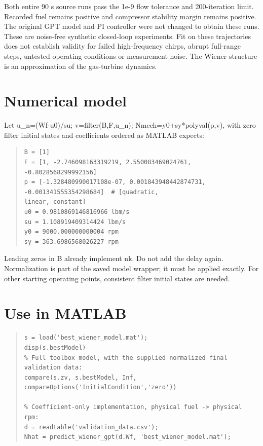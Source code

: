Both entire 90 s source runs pass the 1e-9 flow tolerance and 200-iteration limit.
Recorded fuel remains positive and compressor stability margin remains positive.
The original GPT model and PI controller were not changed to obtain these runs.
These are noise-free synthetic closed-loop experiments. Fit on these trajectories
does not establish validity for failed high-frequency chirps, abrupt full-range
steps, untested operating conditions or measurement noise. The Wiener structure
is an approximation of the gas-turbine dynamics.

\section{Numerical model}

Let u\_\allowbreak n=(Wf-u0)/su; v=filter(B,F,u\_\allowbreak n); Nmech=y0+sy*polyval(p,v),
with zero filter initial states and coefficients ordered as MATLAB expects:

\begin{quote}\footnotesize
\begin{verbatim}
B = [1]
F = [1, -2.746098163319219, 2.550083469024761, -0.8028568299992156]
p = [-1.328480990017108e-07, 0.001843948442874731, -0.001341555354298684]  # [quadratic, 
linear, constant]
u0 = 0.9810869146816966 lbm/s
su = 1.108919409314424 lbm/s
y0 = 9000.000000000004 rpm
sy = 363.6986568026227 rpm
\end{verbatim}
\end{quote}

Leading zeros in B already implement nk. Do not add the delay again.
Normalization is part of the saved model wrapper; it must be applied exactly.
For other starting operating points, consistent filter initial states are needed.

\section{Use in MATLAB}

\begin{quote}\footnotesize
\begin{verbatim}
s = load('best_wiener_model.mat');
disp(s.bestModel)
% Full toolbox model, with the supplied normalized final validation data:
compare(s.zv, s.bestModel, Inf, compareOptions('InitialCondition','zero'))

% Coefficient-only implementation, physical fuel -> physical rpm:
d = readtable('validation_data.csv');
Nhat = predict_wiener_gpt(d.Wf, 'best_wiener_model.mat');
\end{verbatim}
\end{quote}

